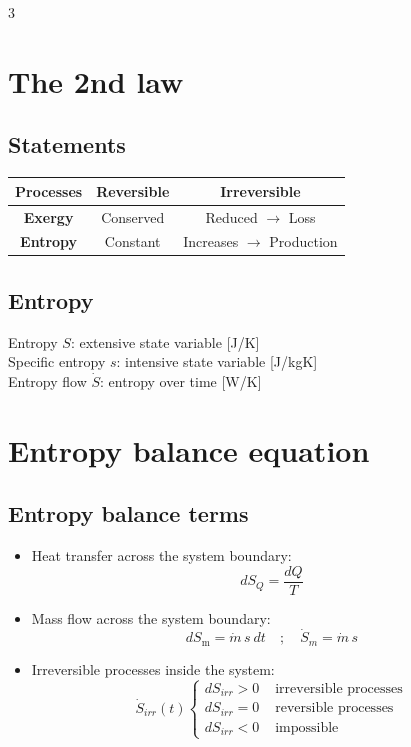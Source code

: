 \documentclass[9pt, landscape, a4paper]{article}
\begin{document}
\begin{multicols*}{3}
\section{The 2nd law}
\subsection{Statements}

\begin{center}
  \begin{tabular}{|c|c|c|}
    \hline \textbf{Processes}& \textbf{Reversible} & \textbf{Irreversible}\\
    \hline \textbf{Exergy} & Conserved & Reduced $\rightarrow$ Loss\\
    \hline \textbf{Entropy} & Constant & Increases $\rightarrow$ Production\\
    \hline
  \end{tabular}
\end{center}

\subsection{Entropy}
Entropy $S$: extensive state variable [J/K]\\[1ex]
Specific entropy $s$: intensive state variable [J/kgK]\\[1ex]
Entropy flow $\dot{S}$: entropy over time [W/K]

\section{Entropy balance equation}
\figbox{\[dS = dS_Q + dS_m + dS_{irr}\]}

\subsection{Entropy balance terms}
\begin{itemize}
    \item Heat transfer across the system boundary:
    \[dS_Q = \frac{dQ}{T}\]
    \item Mass flow across the system boundary:
    \[dS_{\mathrm{m}} = \dot{m}\,s\ dt\quad ; \quad \dot{S}_m = \dot{m}\,s\]
    \item Irreversible processes inside the system:
    \[\dot{S}_{irr}(t)\begin{cases}
      dS_{irr} > 0 &\text{ irreversible processes}\\
      dS_{irr} = 0 &\text{ reversible processes}\\
      dS_{irr} < 0 &\text{ impossible}
    \end{cases}\]
\end{itemize}


\end{multicols*}
\end{document}

